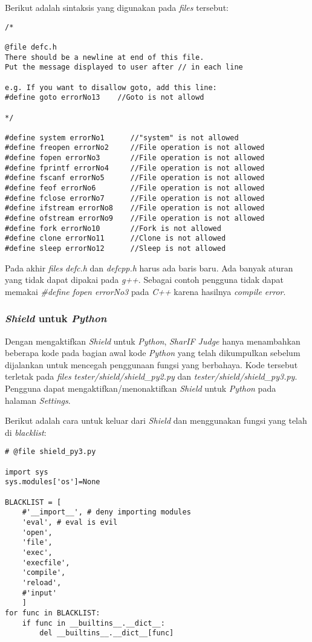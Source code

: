 Berikut adalah sintaksis yang digunakan pada \textit{files} tersebut:

\begin{lstlisting}[basicstyle=\ttfamily, frame=single,
columns=fullflexible, keepspaces=true, breaklines=true, label=ls:20]
/*

@file defc.h
There should be a newline at end of this file.
Put the message displayed to user after // in each line

e.g. If you want to disallow goto, add this line:
#define goto errorNo13    //Goto is not allowd

*/

#define system errorNo1      //"system" is not allowed
#define freopen errorNo2     //File operation is not allowed
#define fopen errorNo3       //File operation is not allowed
#define fprintf errorNo4     //File operation is not allowed
#define fscanf errorNo5      //File operation is not allowed
#define feof errorNo6        //File operation is not allowed
#define fclose errorNo7      //File operation is not allowed
#define ifstream errorNo8    //File operation is not allowed
#define ofstream errorNo9    //File operation is not allowed
#define fork errorNo10       //Fork is not allowed
#define clone errorNo11      //Clone is not allowed
#define sleep errorNo12      //Sleep is not allowed
\end{lstlisting}

Pada akhir \textit{files} \textit{defc.h} dan \textit{defcpp.h} harus ada baris baru. Ada banyak aturan yang tidak dapat dipakai pada \textit{g++}. Sebagai contoh pengguna tidak dapat memakai \textit{\#define fopen errorNo3} pada \textit{C++} karena hasilnya \textit{compile error}.

\subsubsection{\textit{Shield} untuk \textit{Python}}
\label{subsubsec:shield_python}
Dengan mengaktifkan \textit{Shield} untuk \textit{Python}, \textit{SharIF Judge} hanya menambahkan beberapa kode pada bagian awal kode \textit{Python} yang telah dikumpulkan sebelum dijalankan untuk mencegah penggunaan fungsi yang berbahaya. Kode tersebut terletak pada \textit{files} \textit{tester/shield/shield\_py2.py} dan \textit{tester/shield/shield\_py3.py}. Pengguna dapat mengaktifkan/menonaktifkan \textit{Shield} untuk \textit{Python} pada halaman \textit{Settings}.

Berikut adalah cara untuk keluar dari \textit{Shield} dan menggunakan fungsi yang telah di \textit{blacklist}:

\begin{lstlisting}[basicstyle=\ttfamily, frame=single,
columns=fullflexible, keepspaces=true, breaklines=true, label=ls:21]
# @file shield_py3.py

import sys
sys.modules['os']=None

BLACKLIST = [
	#'__import__', # deny importing modules
	'eval', # eval is evil
	'open',
	'file',
	'exec',
	'execfile',
	'compile',
	'reload',
	#'input'
	]
for func in BLACKLIST:
	if func in __builtins__.__dict__:
		del __builtins__.__dict__[func]
\end{lstlisting}

